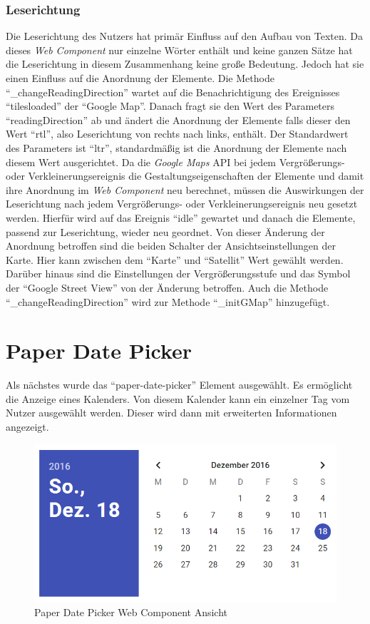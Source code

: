 \documentclass[12pt, paper=a4, bibtotoc, toc=listof, headsepline=true]{scrreprt}
\begin{document}
		\subsubsection{Leserichtung}
		Die Leserichtung des Nutzers hat primär Einfluss auf den Aufbau von Texten. Da dieses \emph{Web Component} nur einzelne Wörter enthält und keine ganzen Sätze hat die Leserichtung in diesem Zusammenhang keine große Bedeutung. Jedoch hat sie einen Einfluss auf die Anordnung der Elemente. Die Methode \enquote{\_changeReadingDirection} wartet auf die Benachrichtigung des Ereignisses \enquote{tilesloaded} der \enquote{Google Map}. Danach fragt sie den Wert des Parameters \enquote{readingDirection} ab und ändert die Anordnung der Elemente falls dieser den Wert \enquote{rtl}, also Leserichtung von rechts nach links, enthält. Der Standardwert des Parameters ist \enquote{ltr}, standardmäßig ist die Anordnung der Elemente nach diesem Wert ausgerichtet. Da die \emph{Google Maps} \ac{API} bei jedem Vergrößerungs- oder Verkleinerungsereignis die Gestaltungseigenschaften der Elemente und damit ihre Anordnung im \emph{Web Component} neu berechnet, müssen die Auswirkungen der Leserichtung nach jedem Vergrößerungs- oder Verkleinerungsereignis neu gesetzt werden. Hierfür wird auf das Ereignis \enquote{idle} gewartet und danach die Elemente, passend zur Leserichtung, wieder neu geordnet. Von dieser Änderung der Anordnung betroffen sind die beiden Schalter der Ansichtseinstellungen der Karte. Hier kann zwischen dem \enquote{Karte} und \enquote{Satellit} Wert gewählt werden. Darüber hinaus sind die Einstellungen der Vergrößerungsstufe und das Symbol der \enquote{Google Street View} von der Änderung betroffen. Auch die Methode \enquote{\_changeReadingDirection} wird zur Methode \enquote{\_initGMap} hinzugefügt.
		\newpage
	\section{Paper Date Picker}
		Als nächstes wurde das \enquote{paper-date-picker} Element ausgewählt.\cite{datPic} Es ermöglicht die Anzeige eines Kalenders. Von diesem Kalender kann ein einzelner Tag vom Nutzer ausgewählt werden. Dieser wird dann mit erweiterten Informationen angezeigt.
		\begin{figure}[H]		
			\centering
			\includegraphics[width=\textwidth,height=\textheight,keepaspectratio]{datPic.png}
			\caption[Paper Date Picker]{Paper Date Picker Web Component Ansicht}
			\label{img:datPic}
		\end{figure}
\end{document}
